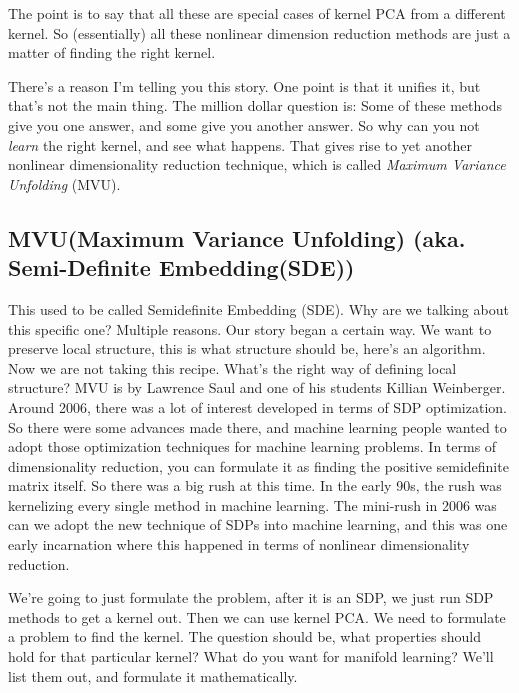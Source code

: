 The point is to say that all these are special cases of kernel PCA from a different kernel. So (essentially) all these nonlinear dimension reduction methods are just a matter of finding the right kernel.

There's a reason I'm telling you this story. One point is that it unifies it, but that's not the main thing. The million dollar question is: Some of these methods give you one answer, and some give you another answer. So why can you not \textit{learn} the right kernel, and see what happens. That gives rise to yet another nonlinear dimensionality reduction technique, which is called \textit{Maximum Variance Unfolding} (MVU).

\subsection*{MVU(Maximum Variance Unfolding) (aka. Semi-Definite Embedding(SDE))}

This used to be called Semidefinite Embedding (SDE). Why are we talking about this specific one? Multiple reasons. Our story began a certain way. We want to preserve local structure, this is what structure should be, here's an algorithm. Now we are not taking this recipe. What's the right way of defining local structure? MVU is by Lawrence Saul and one of his students Killian Weinberger. Around 2006, there was a lot of interest developed in terms of SDP optimization. So there were some advances made there, and machine learning people wanted to adopt those optimization techniques for machine learning problems. In terms of dimensionality reduction, you can formulate it as finding the positive semidefinite matrix itself. So there was a big rush at this time. In the early 90s, the rush was kernelizing every single method in machine learning. The mini-rush in 2006 was can we adopt the new technique of SDPs into machine learning, and this was one early incarnation where this happened in terms of nonlinear dimensionality reduction.

We're going to just formulate the problem, after it is an SDP, we just run SDP methods to get a kernel out. Then we can use kernel PCA. We need to formulate a problem to find the kernel. The question should be, what properties should hold for that particular kernel? What do you want for manifold learning? We'll list them out, and formulate it mathematically. 


